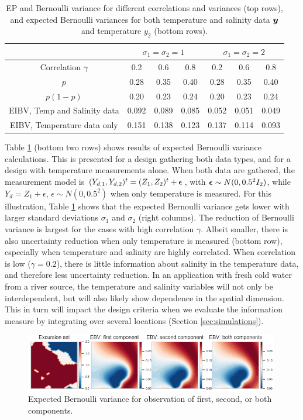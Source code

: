 \begin{table}[!h] \centering \caption{EP and Bernoulli variance for
    different correlations and variances (top rows), and expected
    Bernoulli variances for both temperature and salinity data ${\boldsymbol y}$ and 
    temperature $y_2$ (bottom rows).}
  \begin{tabular}{c|ccc|ccc}
 &\multicolumn{3}{c}{$\sigma_1=\sigma_2=1$} & \multicolumn{3}{c}{$\sigma_1=\sigma_2=2$} \\
\hline
Correlation $\gamma$ & 0.2 & 0.6 & 0.8 & 0.2 & 0.6 & 0.8 \\
\hline
$p$ & 0.28 & 0.35 & 0.40 & 0.28 & 0.35 & 0.40 \\ 
$p(1-p)$ & 0.20 & 0.23 & 0.24 & 0.20 & 0.23 & 0.24 \\ 
EIBV, Temp and Salinity data & 0.092 & 0.089 & 0.085 & 0.052 & 0.051 & 0.049 \\ 
EIBV, Temperature data only & 0.151 & 0.138 & 0.123 & 0.137 & 0.114 & 0.093 \\ 
\hline
\end{tabular}
\label{tab:sim_rhoab}
\end{table}

Table \ref{tab:sim_rhoab} (bottom two rows) shows results of expected
Bernoulli variance calculations. This is presented for a design
gathering both data types, and for a design with temperature
measurements alone. When both data are gathered, the measurement model is
$(Y_{d,1},Y_{d,2})^t=(Z_1,Z_2)^t+{\boldsymbol \epsilon}$, with ${\boldsymbol \epsilon} \sim N(0,0.5^2I_2)$, while $Y_d=Z_1+\epsilon$, $\epsilon \sim N(0,0.5^2)$ when only temperature is measured.
For this illustration, Table \ref{tab:sim_rhoab} shows that the
expected Bernoulli variance gets lower with larger standard deviations
$\sigma_1$ and $\sigma_2$ (right columns). The reduction of Bernoulli
variance is largest for the cases with high correlation
$\gamma$. Albeit smaller, there is also uncertainty reduction when
only temperature is measured (bottom row), especially when temperature
and salinity are highly correlated. When correlation is low
($\gamma=0.2$), there is little information about salinity in the
temperature data, and therefore less uncertainty reduction. In an
application with fresh cold water from a river source, the temperature
and salinity variables will not only be interdependent, but will also
likely show dependence in the spatial dimension. This in turn will
impact the design criteria when we evaluate the information measure by
integrating over several locations (Section \ref{sec:simulations}).




\begin{figure}[h!] \centering
  \includegraphics[width=0.99\textwidth]{Figures/ebvs.png}
  \caption{Expected Bernoulli variance for observation of first, second, or both components.}
\label{illus_bivarDens}
\end{figure}


